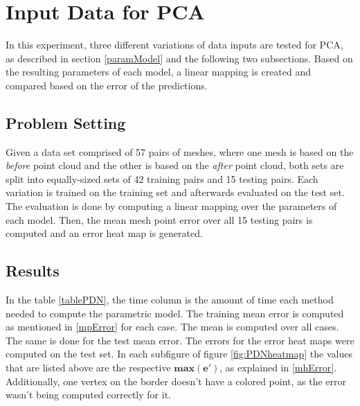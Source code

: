 \section{Input Data for PCA}
In this experiment, three different variations of data inputs are tested for PCA, as described in section \ref{paramModel} and the following two subsections. Based on the resulting parameters of each model, a linear mapping is created and compared based on the error of the predictions.

\subsection{Problem Setting}
Given a data set comprised of 57 pairs of meshes, where one mesh is based on the \textit{before} point cloud and the other is based on the \textit{after} point cloud, both sets are split into equally-sized sets of 42 training pairs and 15 testing pairs. Each variation is trained on the training set and afterwards evaluated on the test set. The evaluation is done by computing a linear mapping over the parameters of each model. Then, the mean mesh point error over all 15 testing pairs is computed and an error heat map is generated.
\subsection{Results}
In the table \ref{tablePDN}, the time column is the amount of time each method needed to compute the parametric model. The training mean error is computed as mentioned in \ref{mpError} for each case. The mean is computed over all cases. The same is done for the test mean error. The errors for the error heat maps were computed on the test set. In each subfigure of figure \ref{fig:PDNheatmap} the values that are listed above are the respective $\mathbf{max(e')}$, as explained in \ref{mhError}. Additionally, one vertex on the border doesn't have a colored point, as the error wasn't being computed correctly for it.

